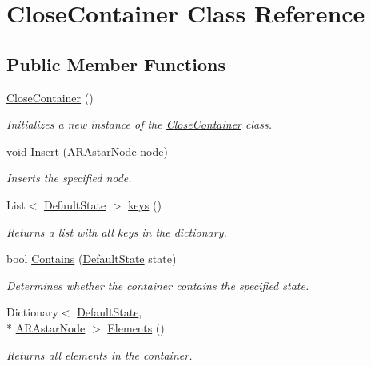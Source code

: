 \hypertarget{class_close_container}{\section{Close\-Container Class Reference}
\label{class_close_container}
}
\subsection*{Public Member Functions}
\begin{DoxyCompactItemize}
\item 
\hyperlink{class_close_container_ac5d33c2ef7405e4dec717eb9cc5f049d}{Close\-Container} ()
\begin{DoxyCompactList}\small\item\em Initializes a new instance of the \hyperlink{class_close_container}{Close\-Container} class. \end{DoxyCompactList}\item 
void \hyperlink{class_close_container_a52aad3abda6bedf9ce5046cff5268c4b}{Insert} (\hyperlink{class_a_r_astar_node}{A\-R\-Astar\-Node} node)
\begin{DoxyCompactList}\small\item\em Inserts the specified node. \end{DoxyCompactList}\item 
List$<$ \hyperlink{class_default_state}{Default\-State} $>$ \hyperlink{class_close_container_a70df1c9c44b48239dec94bf34e3ddfcc}{keys} ()
\begin{DoxyCompactList}\small\item\em Returns a list with all keys in the dictionary. \end{DoxyCompactList}\item 
bool \hyperlink{class_close_container_af3fed08a9636b657f8f59512861aa095}{Contains} (\hyperlink{class_default_state}{Default\-State} state)
\begin{DoxyCompactList}\small\item\em Determines whether the container contains the specified state. \end{DoxyCompactList}\item 
Dictionary$<$ \hyperlink{class_default_state}{Default\-State}, \\*
\hyperlink{class_a_r_astar_node}{A\-R\-Astar\-Node} $>$ \hyperlink{class_close_container_ac18391d6d973ff76bc10346a7b469257}{Elements} ()
\begin{DoxyCompactList}\small\item\em Returns all elements in the container. \end{DoxyCompactList}\item 

\end{DoxyCompactItemize}
